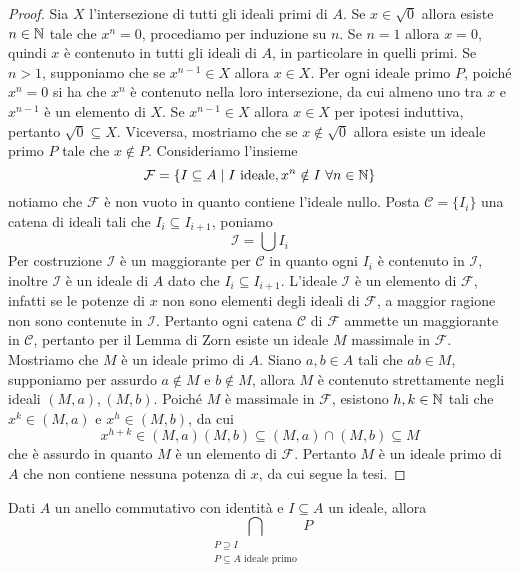 \documentclass[11pt]{scrartcl}
\begin{document}
\begin{proof}
    Sia $X$ l'intersezione di tutti gli ideali primi di $A$. 
    Se $x \in \sqrt{0}$ allora esiste $n \in \mathbb N$ tale che $x^n = 0$, procediamo
    per induzione su $n$. Se $n = 1$ allora $x = 0$, quindi $x$ è contenuto 
    in tutti gli ideali di $A$, in particolare in quelli primi. Se $n > 1$, 
    supponiamo che se $x^{n - 1} \in X$ allora $x \in X$.
    Per ogni ideale primo $P$, poiché $x^n = 0$ si ha che $x^n$ è contenuto nella
    loro intersezione, da cui almeno uno tra $x$ e $x^{n - 1}$ è un elemento
    di $X$. Se $x^{n - 1} \in X$ allora $x \in X$ per ipotesi induttiva, pertanto 
    $\sqrt{0} \subseteq X$. Viceversa, mostriamo che se $x \notin \sqrt{0}$
    allora esiste un ideale primo $P$ tale che $x \notin P$. Consideriamo 
    l'insieme
    \[
        \mathcal{F} = \{I \subseteq A \mid I \text{ ideale}, x^n \notin I
        ~\forall n \in \mathbb N\}
    \]
    notiamo che $\mathcal{F}$ è non vuoto in quanto contiene l'ideale nullo.
    Posta $\mathscr{C} = \{I_i\}$ una catena di ideali tali che $I_i \subseteq I_{i + 1}$,
    poniamo
    \[
        \mathcal{I} = \bigcup I_i
    \]
    Per costruzione $\mathcal{I}$ è un maggiorante per $\mathscr{C}$ in quanto
    ogni $I_i$ è contenuto in $\mathcal{I}$, inoltre $\mathcal{I}$
    è un ideale di $A$ dato che $I_i \subseteq I_{i + 1}$. L'ideale $\mathcal{I}$
    è un elemento di $\mathcal{F}$, infatti se le potenze di $x$ non sono elementi
    degli ideali di $\mathcal{F}$, a maggior ragione non sono contenute in $\mathcal{I}$.
    Pertanto ogni catena $\mathscr{C}$ di $\mathcal{F}$ ammette un maggiorante 
    in $\mathscr{C}$, pertanto per il Lemma di Zorn esiste un ideale $M$ massimale
    in $\mathcal{F}$. Mostriamo che $M$ è un ideale primo di $A$. Siano $a, b \in A$
    tali che $ab \in M$, supponiamo per assurdo $a \notin M$ e $b \notin M$,
    allora $M$ è contenuto strettamente negli ideali $(M, a), (M, b)$. Poiché
    $M$ è massimale in $\mathcal{F}$, esistono $h, k \in \mathbb N$ tali che $x^k \in (M, a)$
    e $x^h \in (M, b)$, da cui
    \[
        x^{h + k} \in (M, a)(M, b) \subseteq (M, a)\cap (M, b) \subseteq M
    \]
    che è assurdo in quanto $M$ è un elemento di $\mathcal{F}$. Pertanto 
    $M$ è un ideale primo di $A$ che non contiene nessuna potenza di $x$, 
    da cui segue la tesi.
\end{proof}

\begin{corollary}
    Dati $A$ un anello commutativo con identità e $I\subseteq A$ un ideale, 
    allora
    \[
        \bigcap_{\substack{P\supseteq I\\ P \subseteq A\text{ ideale primo}}}P
    \]
\end{corollary}
\end{document}
